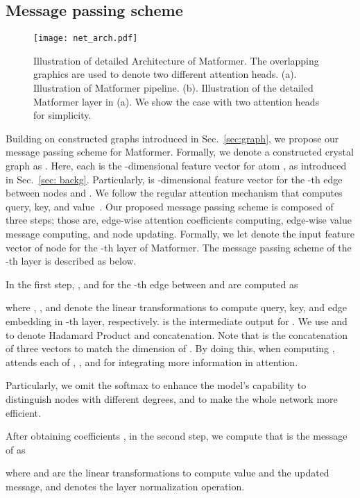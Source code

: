 \documentclass{article}
\begin{document}
\subsection{Message passing scheme}
\label{sec:msg}

\begin{figure}[t]
    \centering
    \texttt{[image: net\_arch.pdf]}
    \caption{
    Illustration of detailed Architecture of Matformer. The overlapping graphics are used to denote two different attention heads. (a). Illustration of Matformer pipeline. (b). Illustration of the detailed Matformer layer in (a). We show the case with two attention heads for simplicity.
    }
    \label{fig:net_arch}
\end{figure}



Building on constructed graphs introduced in Sec.~\ref{sec:graph},
we propose our message passing scheme for Matformer.
Formally, we denote a constructed crystal graph as .
Here, each  is the -dimensional feature vector for atom ,
as introduced in Sec.~\ref{sec: backg}.
Particularly,
 is -dimensional feature vector for the -th edge between nodes  and . 
We follow the regular attention mechanism that computes query, key, and value~\cite{liu2020global,liu2021cleftnet}.
Our proposed message passing scheme is composed of three 
steps; those are, edge-wise attention coefficients computing, edge-wise value message computing, and node updating. 
Formally, we let  denote the input feature vector of node  for the -th layer of Matformer. The message passing scheme of the -th layer is described as below.

In the first step, ,  and  for the -th edge between  and  are computed as

where , , and  denote the linear transformations to compute query, key, and edge embedding in -th layer, respectively. 
 is the intermediate output for .
We use  and  to denote Hadamard Product and concatenation. 
Note that  is the concatenation of three  vectors to match the dimension of .
By doing this, when computing ,  attends each of , , and  for integrating more information in attention.

Particularly, we omit the softmax to enhance the model's capability to distinguish nodes with different degrees, and to make the whole network more efficient.

After obtaining coefficients , in the second step, we compute  that is the message of  as

where  and  are the linear transformations to compute value and the updated message, and  denotes the layer normalization operation. 
\end{document}
